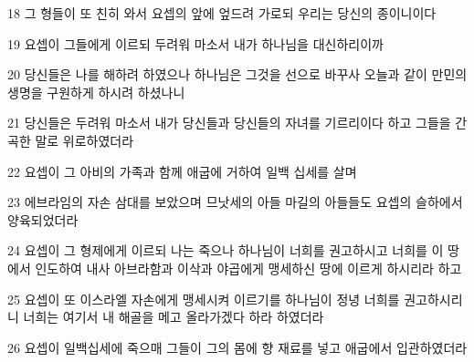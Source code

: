\par 18 그 형들이 또 친히 와서 요셉의 앞에 엎드려 가로되 우리는 당신의 종이니이다
\par 19 요셉이 그들에게 이르되 두려워 마소서 내가 하나님을 대신하리이까
\par 20 당신들은 나를 해하려 하였으나 하나님은 그것을 선으로 바꾸사 오늘과 같이 만민의 생명을 구원하게 하시려 하셨나니
\par 21 당신들은 두려워 마소서 내가 당신들과 당신들의 자녀를 기르리이다 하고 그들을 간곡한 말로 위로하였더라
\par 22 요셉이 그 아비의 가족과 함께 애굽에 거하여 일백 십세를 살며
\par 23 에브라임의 자손 삼대를 보았으며 므낫세의 아들 마길의 아들들도 요셉의 슬하에서 양육되었더라
\par 24 요셉이 그 형제에게 이르되 나는 죽으나 하나님이 너희를 권고하시고 너희를 이 땅에서 인도하여 내사 아브라함과 이삭과 야곱에게 맹세하신 땅에 이르게 하시리라 하고
\par 25 요셉이 또 이스라엘 자손에게 맹세시켜 이르기를 하나님이 정녕 너희를 권고하시리니 너희는 여기서 내 해골을 메고 올라가겠다 하라 하였더라
\par 26 요셉이 일백십세에 죽으매 그들이 그의 몸에 향 재료를 넣고 애굽에서 입관하였더라


